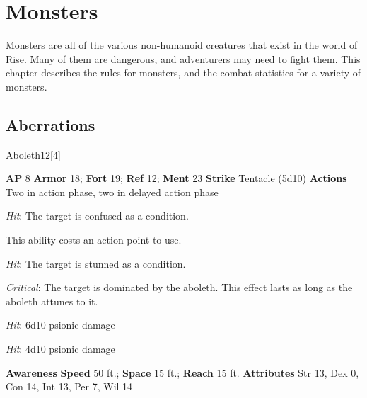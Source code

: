 \chapter{Monsters}
Monsters are all of the various non-humanoid creatures that exist in the world of Rise.
Many of them are dangerous, and adventurers may need to fight them.
This chapter describes the rules for monsters, and the combat statistics for a variety of monsters.
\section{Aberrations}
\begin{monsection}{Aboleth}{12}[4]
\vspace{-1em}\vspace{-1em}
\begin{spellcontent}
\begin{spelltargetinginfo}
{\textbf{AP} 8}
\pari \textbf{Armor} 18;
\textbf{Fort} 19;
\textbf{Ref} 12;
\textbf{Ment} 23
\pari \textbf{Strike} Tentacle  (5d10)
\pari \textbf{Actions} Two in action phase, two in delayed action phase
\end{spelltargetinginfo}
\begin{spelleffects}
\pari
{}
\par
\par \textit{Hit}: The target is confused as a condition.
\vspace{0.5em}
\pari
{}
\par
This ability costs an action point to use.
\par \textit{Hit}: The target is stunned as a condition.
\par \textit{Critical}:
The target is dominated by the aboleth.
This effect lasts as long as the aboleth attunes to it.
\vspace{0.5em}
\pari
{}
\par
\par \textit{Hit}: 6d10 psionic damage
\vspace{0.5em}
\pari
{}
\par
\par \textit{Hit}: 4d10 psionic damage
\end{spelleffects}
\end{spellcontent}
\begin{spellsubcontent}
\begin{spellfooter}
\pari \textbf{Awareness} 
\pari \textbf{Speed} 50 ft.;
\textbf{Space} 15 ft.;
\textbf{Reach} 15 ft.
\pari \textbf{Attributes}
Str 13,
Dex 0,
Con 14,
Int 13,
Per 7,
Wil 14
\end{spellfooter}
\end{spellsubcontent}
\end{monsection}
